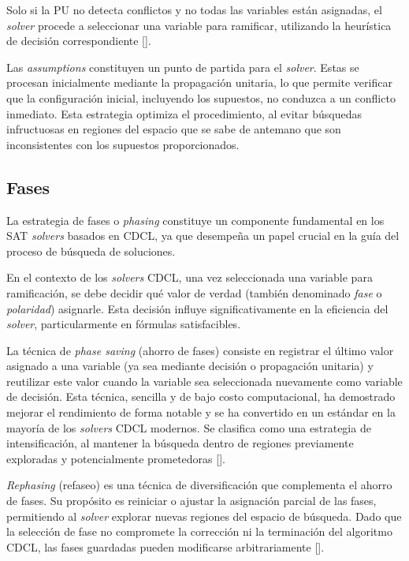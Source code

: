 Solo si la PU no detecta conflictos y no todas las variables están asignadas, el \textit{solver} procede a seleccionar una variable para ramificar, utilizando la heurística de decisión correspondiente [\cite{sun2024autosat}].

Las \textit{assumptions} constituyen un punto de partida para el \textit{solver}. Estas se procesan inicialmente mediante la propagación unitaria, lo que permite verificar que la configuración inicial, incluyendo los supuestos, no conduzca a un conflicto inmediato. Esta estrategia optimiza el procedimiento, al evitar búsquedas infructuosas en regiones del espacio que se sabe de antemano que son inconsistentes con los supuestos proporcionados.

\subsection{Fases}
\label{subsec:cadical-phasing}
La estrategia de fases o \textit{phasing} constituye un componente fundamental en los SAT \textit{solvers} basados en CDCL, ya que desempeña un papel crucial en la guía del proceso de búsqueda de soluciones.

En el contexto de los \textit{solvers} CDCL, una vez seleccionada una variable para ramificación, se debe decidir qué valor de verdad (también denominado \textit{fase} o \textit{polaridad}) asignarle. Esta decisión influye significativamente en la eficiencia del \textit{solver}, particularmente en fórmulas satisfacibles.

La técnica de \textit{phase saving} (ahorro de fases) consiste en registrar el último valor asignado a una variable (ya sea mediante decisión o propagación unitaria) y reutilizar este valor cuando la variable sea seleccionada nuevamente como variable de decisión. Esta técnica, sencilla y de bajo costo computacional, ha demostrado mejorar el rendimiento de forma notable y se ha convertido en un estándar en la mayoría de los \textit{solvers} CDCL modernos. Se clasifica como una estrategia de intensificación, al mantener la búsqueda dentro de regiones previamente exploradas y potencialmente prometedoras [\cite{cai2022better_heuristics}].

\textit{Rephasing} (refaseo) es una técnica de diversificación que complementa el ahorro de fases. Su propósito es reiniciar o ajustar la asignación parcial de las fases, permitiendo al \textit{solver} explorar nuevas regiones del espacio de búsqueda. Dado que la selección de fase no compromete la corrección ni la terminación del algoritmo CDCL, las fases guardadas pueden modificarse arbitrariamente [\cite{cai2022better_heuristics}].

